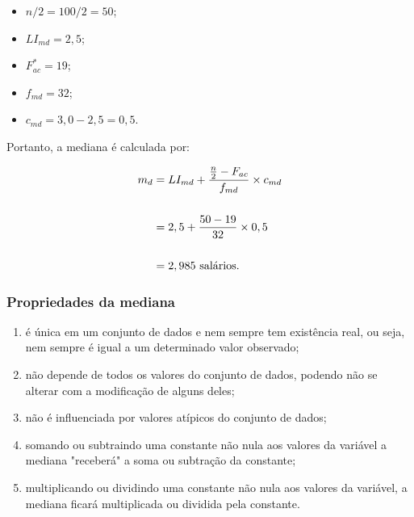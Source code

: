\documentclass[11pt,fleqn]{book} %
\begin{document}
\begin{example}
\begin{itemize}
\item $n/2=100/2=50$;
\item $LI_{md}=2,5$;
\item $F_{ac}^*=19$;
\item $f_{md}=32$;
\item $c_{md}=3,0-2,5=0,5$. \\
\end{itemize}

\vspace{2cm}

Portanto, a mediana é calculada por: 

\begin{ceqn}
\begin{align*}
\centering
m_d
&= LI_{md}+\frac{\frac{n}{2}-F_{ac}}{f_{md}} \times c_{md} \\ \\
&= 2,5+\frac{50-19}{32} \times 0,5 \\ \\
&= 2,985 \mbox{ salários}. 
\end{align*}
\end{ceqn}

\end{example}

\vspace{0,3cm}

\subsubsection{Propriedades da mediana}

\begin{enumerate}

\item é única em um conjunto de dados e nem sempre tem existência real, ou seja, nem sempre é igual a um determinado valor observado;

\item não depende de todos os valores do conjunto de dados, podendo não se alterar com a modificação de alguns deles; 

\item não é influenciada por valores atípicos do conjunto de dados;

\item somando ou subtraindo uma constante não nula aos valores da variável a mediana "receberá" a soma ou subtração da constante;

\item multiplicando ou dividindo uma constante não nula aos valores da variável, a mediana ficará multiplicada ou dividida pela constante.

\end{enumerate}
\end{document}
